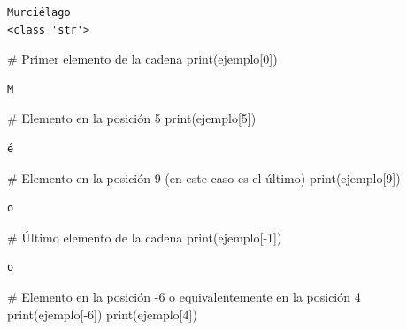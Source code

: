 \documentclass[
  spanish,
  letterpaper,
]{scrbook}
\newenvironment{Shaded}{\begin{snugshade}}{\end{snugshade}}
\newcommand{\BuiltInTok}[1]{\textcolor[rgb]{0.00,0.23,0.31}{#1}}
\newcommand{\CommentTok}[1]{\textcolor[rgb]{0.37,0.37,0.37}{#1}}
\newcommand{\DecValTok}[1]{\textcolor[rgb]{0.68,0.00,0.00}{#1}}
\newcommand{\NormalTok}[1]{\textcolor[rgb]{0.00,0.23,0.31}{#1}}
\newcommand{\OperatorTok}[1]{\textcolor[rgb]{0.37,0.37,0.37}{#1}}
\theoremstyle{definition}
\theoremstyle{remark}
\begin{document}
\begin{verbatim}
Murciélago
<class 'str'>
\end{verbatim}

\begin{Shaded}
\begin{Highlighting}[]
\CommentTok{\# Primer elemento de la cadena}
\BuiltInTok{print}\NormalTok{(ejemplo[}\DecValTok{0}\NormalTok{]) }
\end{Highlighting}
\end{Shaded}

\begin{verbatim}
M
\end{verbatim}

\begin{Shaded}
\begin{Highlighting}[]
\CommentTok{\# Elemento en la posición 5}
\BuiltInTok{print}\NormalTok{(ejemplo[}\DecValTok{5}\NormalTok{]) }
\end{Highlighting}
\end{Shaded}

\begin{verbatim}
é
\end{verbatim}

\begin{Shaded}
\begin{Highlighting}[]
\CommentTok{\# Elemento en la posición 9 (en este caso es el último)}
\BuiltInTok{print}\NormalTok{(ejemplo[}\DecValTok{9}\NormalTok{]) }
\end{Highlighting}
\end{Shaded}

\begin{verbatim}
o
\end{verbatim}

\begin{Shaded}
\begin{Highlighting}[]
\CommentTok{\# Último elemento de la cadena}
\BuiltInTok{print}\NormalTok{(ejemplo[}\OperatorTok{{-}}\DecValTok{1}\NormalTok{]) }
\end{Highlighting}
\end{Shaded}

\begin{verbatim}
o
\end{verbatim}

\begin{Shaded}
\begin{Highlighting}[]
\CommentTok{\# Elemento en la posición {-}6 o equivalentemente en la posición 4}
\BuiltInTok{print}\NormalTok{(ejemplo[}\OperatorTok{{-}}\DecValTok{6}\NormalTok{]) }
\BuiltInTok{print}\NormalTok{(ejemplo[}\DecValTok{4}\NormalTok{])}
\end{Highlighting}
\end{Shaded}
\end{document}
